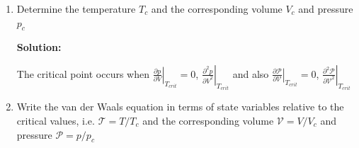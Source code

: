 \documentclass[10pt]{article}
\newenvironment{Solution}
    {\textbf{Solution:}
    
    \vspace{5mm}
    \begin{tcolorbox}
    }
    {
    \end{tcolorbox}
    \vspace{5mm}
    }
\begin{document}
\begin{enumerate}
\begin{enumerate}
\begin{Solution}

\end{Solution}

\item Determine the temperature $T_{c}$ and the corresponding volume $V_{c}$ and pressure $p_{c}$

\begin{Solution}
The critical point occurs when $\left.\frac{\partial p}{\partial V}\right|_{T_{crit}} = 0$, $\left.\frac{\partial^2 p}{{\partial V}^2}\right|_{T_{crit}}$ and also $\left.\frac{\partial \mathcal{P}}{\partial \mathcal{V}}\right|_{T_{crit}} = 0$, $\left.\frac{\partial^2 \mathcal{P}}{{\partial \mathcal{V}}^2}\right|_{T_{crit}}$
\end{Solution}

\item Write the van der Waals equation in terms of state variables relative to the critical values, i.e. $\mathcal{T}=T / T_{c}$ and the corresponding volume $\mathcal{V}=V / V_{c}$ and pressure $\mathcal{P}=p / p_{c}$


\end{enumerate}
\end{enumerate}
\end{document}
